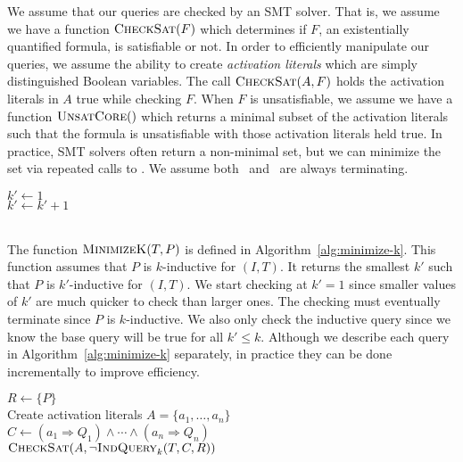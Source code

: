 We assume that our queries are checked by an SMT solver. That is, we
assume we have a function $\textsc{CheckSat}(F)$ which determines if $F$, an
existentially quantified formula, is satisfiable or not. In order to
efficiently manipulate our queries, we assume the ability to create
{\em activation literals} which are simply distinguished Boolean
variables. The call $\textsc{CheckSat}(A, F)$ holds the activation literals in
$A$ true while checking $F$. When $F$ is unsatisfiable, we assume we
have a function $\textsc{UnsatCore}()$ which returns a minimal subset of the
activation literals such that the formula is unsatisfiable with those
activation literals held true. In practice, SMT solvers often return a
non-minimal set, but we can minimize the set via repeated calls to
\checksat. We assume both \checksat\ and \unsatcore\ are always
terminating.

\begin{algorithm}[t]
  $k' \leftarrow 1$ \\
   {
    $k' \leftarrow k' + 1$ \\
    }
   \\
\caption{$\mink(T, P)$}
\label{alg:minimize-k}
\end{algorithm}

The function $\mink(T, P)$ is defined in
Algorithm~\ref{alg:minimize-k}. This function assumes that $P$ is
$k$-inductive for $(I, T)$. It returns the smallest $k'$ such that $P$
is $k'$-inductive for $(I, T)$. We start checking at $k' = 1$ since
smaller values of $k'$ are much quicker to check than larger ones. The
checking must eventually terminate since $P$ is $k$-inductive. We also
only check the inductive query since we know the base query will be
true for all $k' \leq k$. Although we describe each query in
Algorithm~\ref{alg:minimize-k} separately, in practice they can be
done incrementally to improve efficiency.

\begin{algorithm}[t]
  $R \leftarrow \{P\}$ \\
  Create activation literals $A = \{a_1, \ldots, a_n\}$ \\
  $C \leftarrow (a_1 \Rightarrow Q_1) \land \cdots \land (a_n \Rightarrow Q_n)$ \\
   {
    $\textsc{CheckSat}(A, \neg\textsc{IndQuery}_k(T, C, R))$ \\
  }
\caption{$\reduceinv_k(T, \{Q_1, \ldots, Q_n\}, P)$}
\label{alg:reduce-invariants}
\end{algorithm}

